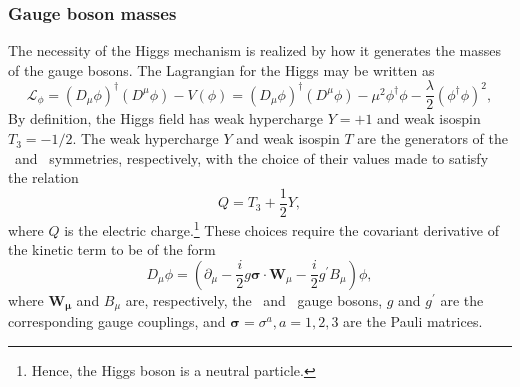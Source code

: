 \subsubsection{Gauge boson masses}

The necessity of the Higgs mechanism is realized by how it generates the masses of the gauge bosons. The Lagrangian for the Higgs may be written as
\begin{equation}
  \mathcal{L}_{\phi} = (D_{\mu}\phi)^{\dag}(D^{\mu}\phi) - V(\phi) = (D_{\mu}\phi)^{\dag}(D^{\mu}\phi) - \mu^{2}\phi^{\dag}\phi - \frac{\lambda}{2}(\phi^{\dag}\phi)^{2},
  \label{eq:Lhiggs}
\end{equation}
By definition, the Higgs field has weak hypercharge $Y = +1$ and weak isospin $T_{3} = -1/2$. The weak hypercharge $Y$ and weak isospin $T$ are the generators of the \symWEAK\ and \symEM\ symmetries, respectively, with the choice of their values made to satisfy the relation
\begin{equation}
  Q = T_{3} + \frac{1}{2}Y,
\end{equation}
where $Q$ is the electric charge.\footnote{Hence, the Higgs boson is a neutral particle.} These choices require the covariant derivative of the kinetic term to be of the form
\begin{equation}
  D_{\mu}\phi = (\partial_{\mu} - \frac{i}{2}g\boldsymbol\sigma\cdot\mathbf{W}_{\mu} - \frac{i}{2}g^{\prime}B_{\mu})\phi,
\end{equation}
where $\mathbf{W_{\mu}}$ and $B_{\mu}$ are, respectively, the \symWEAK\ and \symEM\ gauge bosons, $g$ and $g^{\prime}$ are the corresponding gauge couplings, and $\boldsymbol\sigma = \sigma^{a}, a = 1, 2, 3$ are the Pauli matrices.

